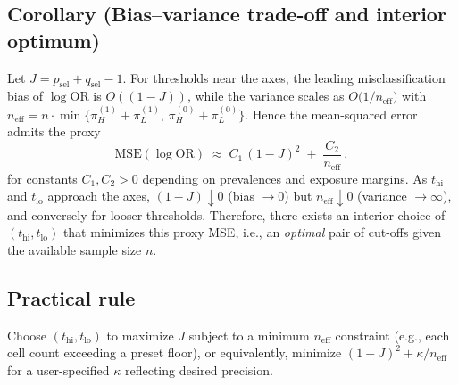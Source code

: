\documentclass[pdflatex,sn-mathphys-num]{sn-jnl}%
\theoremstyle{thmstyleone}%
\theoremstyle{thmstyletwo}%
\theoremstyle{thmstylethree}%
\begin{document}
\subsection{Corollary (Bias–variance trade-off and interior optimum)}
Let $J=p_{\text{sel}}+q_{\text{sel}}-1$. For thresholds near the axes,
the leading misclassification bias of $\log\mathrm{OR}$ is $O((1-J))$, while the variance scales as
$O\!\big(1/n_{\text{eff}}\big)$ with $n_{\text{eff}}=n\cdot\min\{\pi_H^{(1)}+\pi_L^{(1)},\,\pi_H^{(0)}+\pi_L^{(0)}\}$.
Hence the mean-squared error admits the proxy
\[
\mathrm{MSE}(\log\mathrm{OR}) \;\approx\; C_1\,(1-J)^2 \;+\; \frac{C_2}{n_{\text{eff}}}\,,
\]
for constants $C_1,C_2>0$ depending on prevalences and exposure margins. As $t_{\mathrm{hi}}$ and $t_{\mathrm{lo}}$
approach the axes, $(1-J)\downarrow 0$ (bias $\to 0$) but $n_{\text{eff}}\downarrow 0$ (variance $\to\infty$),
and conversely for looser thresholds. Therefore, there exists an interior choice of $(t_{\mathrm{hi}},t_{\mathrm{lo}})$
that minimizes this proxy MSE, i.e., an \emph{optimal} pair of cut-offs given the available sample size $n$.

\subsection{Practical rule}
Choose $(t_{\mathrm{hi}},t_{\mathrm{lo}})$ to maximize $J$ subject to a minimum $n_{\text{eff}}$ constraint
(e.g., each cell count exceeding a preset floor), or equivalently, minimize
$(1-J)^2 + \kappa/n_{\text{eff}}$ for a user-specified $\kappa$ reflecting desired precision.
\end{document}
